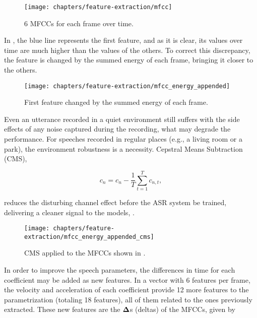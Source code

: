 \begin{figure}[ht]
    \centering
    \texttt{[image: chapters/feature-extraction/mfcc]}
    \caption{6 MFCCs for each frame over time.}
    \label{fig:mfcc}
\end{figure}


In , the blue line represents the first feature, and as it is clear, its values over time are much higher than the values of the others. To correct this discrepancy, the feature is changed by the summed energy of each frame, bringing it closer to the others.

\begin{figure}[ht]
    \centering
    \texttt{[image: chapters/feature-extraction/mfcc\_energy\_appended]}
    \caption{First feature changed by the summed energy of each frame.}
    \label{fig:mfcc_energy_appended}
\end{figure}


Even an utterance recorded in a quiet environment still suffers with the side effects of any noise captured during the recording, what may degrade the performance. For speeches recorded in regular places (e.g., a living room or a park), the environment robustness is a necessity. Cepstral Means Subtraction (CMS),

\begin{equation}
    c_n = c_n - \frac{1}{T} \sum_{t=1}^T c_{n,t},
    \label{eq:cms}
\end{equation}

\noindent reduces the disturbing channel effect before the ASR system be trained, delivering a cleaner signal to the models, .

\begin{figure}[ht]
    \centering
    \texttt{[image: chapters/feature-extraction/mfcc\_energy\_appended\_cms]}
    \caption{CMS applied to the MFCCs shown in .}
    \label{fig:mfcc_energy_appended_cms}
\end{figure}


In order to improve the speech parameters, the differences in time for each coefficient may be added as new features. In a vector with 6 features per frame, the velocity and acceleration of each coefficient provide 12 more features to the parametrization (totaling 18 features), all of them related to the ones previously extracted. These new features are the $\boldsymbol{\Delta}$s (deltas) of the MFCCs, given by

